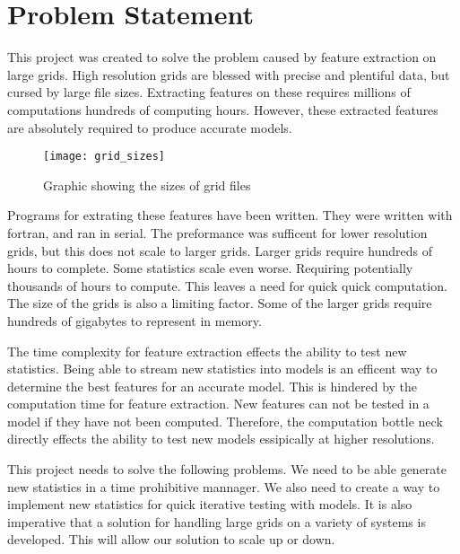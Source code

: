 \section{Problem Statement}
This project was created to solve the problem caused by feature extraction on large grids.
High resolution grids are blessed with precise and plentiful data, but cursed by large file sizes.
Extracting features on these requires millions of computations hundreds of computing hours.
However, these extracted features are absolutely required to produce accurate models.
\begin{figure}[hb]
    \centering
    \texttt{[image: grid\_sizes]}
    \caption{Graphic showing the sizes of grid files}
  \end{figure}

\par
Programs for extrating these features have been written. 
They were written with fortran, and ran in serial.
The preformance was sufficent for lower resolution grids, but this does not scale to larger grids.
Larger grids require hundreds of hours to complete.
Some statistics scale even worse.
Requiring potentially thousands of hours to compute. 
This leaves a need for quick quick computation.
The size of the grids is also a limiting factor. 
Some of the larger grids require hundreds of gigabytes to represent in memory.

\par
The time complexity for feature extraction effects the ability to test new statistics.
Being able to stream new statistics into models is an efficent way to determine the best features for an accurate model.
This is hindered by the computation time for feature extraction.
New features can not be tested in a model if they have not been computed.
Therefore, the computation bottle neck directly effects the ability to test new models essipically at higher resolutions.

\par
This project needs to solve the following problems.
We need to be able generate new statistics in a time prohibitive mannager.
We also need to create a way to implement new statistics for quick iterative testing with models.
It is also imperative that a solution for handling large grids on a variety of systems is developed.
This will allow our solution to scale up or down.

